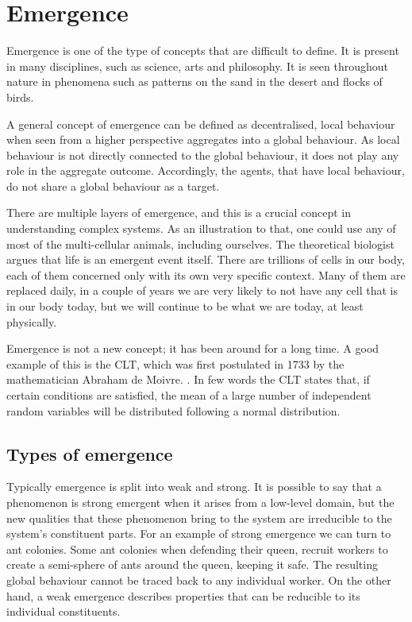 \section{Emergence}

Emergence is one of the type of concepts that are difficult to define. It is present in many disciplines, such as science, arts and philosophy. It is seen throughout nature in phenomena such as patterns on the sand in the desert and flocks of birds.

A general concept of emergence can be defined as decentralised, local behaviour when seen from a higher perspective aggregates into a global behaviour. As local behaviour is not directly connected to the global behaviour, it does not play any role in the aggregate outcome. Accordingly, the agents, that have local behaviour, do not share a global behaviour as a target.

There are multiple layers of emergence, and this is a crucial concept in understanding complex systems.\cite{miller2007complex} As an illustration to that, one could use any of most of the multi-cellular animals, including ourselves. The theoretical biologist \citeauthor{life1010034} argues that life is an emergent event itself. There are trillions of cells in our body, each of them concerned only with its own very specific context. Many of them are replaced daily, in a couple of years we are very likely to not have any cell that is in our body today, but we will continue to be what we are today, at least physically.

Emergence is not a new concept; it has been around for a long time. A good example of this is the \ac{CLT}, which was first postulated in 1733 by the mathematician Abraham de Moivre. \cite{tijms2007understanding}. In few words the \ac{CLT} states that, if certain conditions are satisfied, the mean of a large number of independent random variables will be distributed following a normal distribution.

\subsection{Types of emergence}

Typically emergence is split into weak and strong. It is possible to say that a phenomenon is strong emergent when it arises from a low-level domain, but the new qualities that these phenomenon bring to the system are irreducible to the system's constituent parts.\cite{laughlin2008different} For an example of strong emergence we can turn to ant colonies. Some ant colonies when defending their queen, recruit workers to create a semi-sphere of ants around the queen, keeping it safe. The resulting global behaviour cannot be traced back to any individual worker. On the other hand, a weak emergence describes properties that can be reducible to its individual constituents. 


